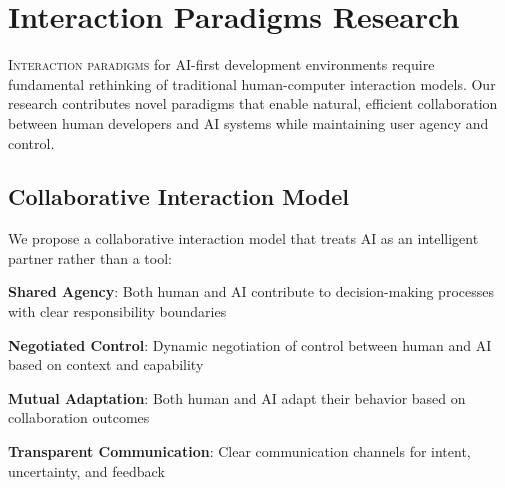 
\section*{Interaction Paradigms Research}

\lettrine{I}{nteraction paradigms} for AI-first development environments require fundamental rethinking of traditional human-computer interaction models. Our research contributes novel paradigms that enable natural, efficient collaboration between human developers and AI systems while maintaining user agency and control.

\subsection*{Collaborative Interaction Model}

We propose a collaborative interaction model that treats AI as an intelligent partner rather than a tool:

\begin{compactlist}
    \item \textbf{Shared Agency}: Both human and AI contribute to decision-making processes with clear responsibility boundaries
    \item \textbf{Negotiated Control}: Dynamic negotiation of control between human and AI based on context and capability
    \item \textbf{Mutual Adaptation}: Both human and AI adapt their behavior based on collaboration outcomes
    \item \textbf{Transparent Communication}: Clear communication channels for intent, uncertainty, and feedback
\end{compactlist}

